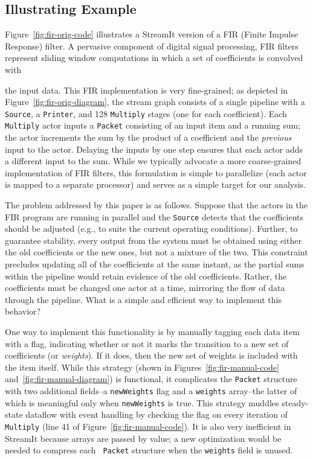 \subsection{Illustrating Example}

Figure~\ref{fig:fir-orig-code} illustrates a StreamIt version of a FIR
(Finite Impulse Response) filter.  A pervasive component of digital
signal processing, FIR filters represent sliding window computations
in which a set of coefficients is convolved with
%

\noindent 
%
the input data.  This FIR implementation is very fine-grained; as
depicted in Figure~\ref{fig:fir-orig-diagram}, the stream graph
consists of a single pipeline with a {\tt Source}, a {\tt Printer},
and 128 {\tt Multiply} stages (one for each coefficient).  Each {\tt
Multiply} actor inputs a {\tt Packet} consisting of an input item and
a running sum; the actor increments the sum by the product of a
coefficient and the {\it previous} input to the actor.  Delaying the
inputs by one step ensures that each actor adds a different input to
the sum.  While we typically advocate a more coarse-grained
implementation of FIR filters, this formulation is simple to
parallelize (each actor is mapped to a separate processor) and serves
as a simple target for our analysis.

The problem addressed by this paper is as follows.  Suppose that the
actors in the FIR program are running in parallel and the {\tt Source}
detects that the coefficients should be adjusted (e.g., to suite the
current operating conditions).  Further, to guarantee stability, every
output from the system must be obtained using either the old
coefficients or the new ones, but not a mixture of the two.  This
constraint precludes updating all of the coefficients at the same
instant, as the partial sums within the pipeline would retain evidence
of the old coefficients.  Rather, the coefficients must be changed one
actor at a time, mirroring the flow of data through the pipeline.
What is a simple and efficient way to implement this behavior?

One way to implement this functionality is by manually tagging each
data item with a flag, indicating whether or not it marks the
transition to a new set of coefficients (or {\it weights}).  If it
does, then the new set of weights is included with the item itself.
While this strategy (shown in Figures~\ref{fig:fir-manual-code}
and~\ref{fig:fir-manual-diagram}) is functional, it complicates the
{\tt Packet} structure with two additional fields--a {\tt newWeights}
flag and a {\tt weights} array--the latter of which is meaningful only
when {\tt newWeights} is true.  This strategy muddles steady-state
dataflow with event handling by checking the flag on every iteration
of {\tt Multiply} (line 41 of Figure~\ref{fig:fir-manual-code}).  It
is also very inefficient in StreamIt because arrays are passed by
value; a new optimization would be needed to compress each {\tt
Packet} structure when the {\tt weights} field is unused.

